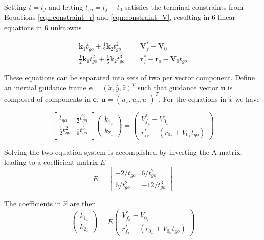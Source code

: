 Setting $t = t_f$ and letting $t_{go} = t_f - t_0$ satisfies the terminal constraints from Equations \ref{eqn:constraint_r} and \ref{eqn:constraint_V}, resulting in 6 linear equations in 6 unknowns

\begin{align}
\label{eqn:system1}
\boldsymbol{k}_1 t_{go} + \frac{1}{2}\boldsymbol{k}_2 t_{go}^2 &= \boldsymbol{V}_f^* - \boldsymbol{V}_0\\
\label{eqn:system2}
\frac{1}{2}\boldsymbol{k}_1 t_{go}^2 + \frac{1}{6}\boldsymbol{k}_2 t_{go}^3 &= \boldsymbol{r}_f^* - \boldsymbol{r}_0 - \boldsymbol{V}_0t_{go}
\end{align}

These equations can be separated into sets of two per vector component. Define an inertial guidance frame $\boldsymbol{e} = (\hat{x},\hat{y},\hat{z})^T$ such that guidance vector $\boldsymbol{u}$ is composed of components in $\boldsymbol{e}$, $\boldsymbol{u} = (u_{x},u_{y},u_{z})^T$. For the equations in $\hat{x}$ we have

\begin{equation}
  \begin{bmatrix}
    t_{go} & \frac{1}{2}t_{go}^2 \\
    \frac{1}{2}t_{go}^2 & \frac{1}{6}t_{go}^3 \\
  \end{bmatrix}
 \left(
	\begin{matrix}
	k_{1_x} \\ 
	k_{2_x} 
	\end{matrix}
\right) = 
 \left(
	\begin{matrix}
	V_{f_x}^* - V_{0_x} \\ 
	r_{f_x}^* - (r_{0_x} + V_{0_x}t_{go}) 
	\end{matrix}
\right)
\end{equation}

Solving the two-equation system is accomplished by inverting the A matrix, leading to a coefficient matrix $E$
\begin{equation}
E = 
	\begin{bmatrix}
	-2/t_{go} & 6/t_{go}^2 \\
	6/t_{go}^2 & -12/t_{go}^3
	\end{bmatrix}
\end{equation}

The coefficients in $\hat{x}$ are then
\begin{equation}
\begin{pmatrix}
k_{1_x} \\
k_{2_x}
\end{pmatrix}
= E
\begin{pmatrix}
V_{f_x}^* - V_{0_x} \\ 
r_{f_x}^* - (r_{0_x} + V_{0_x}t_{go}) 
\end{pmatrix}
\end{equation}

